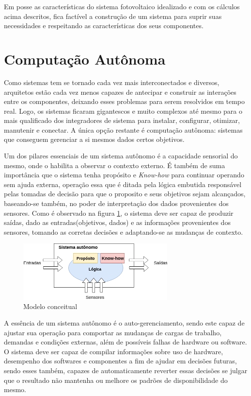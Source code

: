 Em posse as características do sistema fotovoltaico idealizado e com os cálculos acima descritos, fica factível a construção de um sistema para suprir suas necessidades e respeitando as características dos seus componentes.

\section{Computação Autônoma}

Como sistemas tem se tornado cada vez mais interconectados e diversos, arquitetos estão cada vez menos capazes de antecipar e construir as interações entre os componentes, deixando esses problemas para serem resolvidos em tempo real. Logo, os sistemas ficaram gigantescos e muito complexos até mesmo para o mais qualificado dos integradores de sistema para instalar, configurar, otimizar, manutenir e conectar. A única opção restante é computação autônoma: sistemas que conseguem gerenciar a si mesmos dados certos objetivos.\cite{Kephart2003}

Um dos pilares essenciais de um sistema autônomo é a capacidade sensorial do mesmo, onde o habilita a observar o contexto externo. É também de suma importância que o sistema tenha propósito e \textit{Know-how} para continuar operando sem ajuda externa, operação essa que é ditada pela lógica embutida responsável pelas tomadas de decisão para que o proposito e seus objetivos sejam alcançados, baseando-se também, no poder de interpretação dos dados provenientes dos sensores. Como é observado na figura \ref{fig:modelo-conceitual}, o sistema deve ser capaz de produzir saídas, dado as entradas(objetivos, dados) e as informações provenientes dos sensores, tomando as corretas decisões e adaptando-se as mudanças de contexto.

\begin{figure}[H]
    \centering
    \includegraphics[width=0.7\textwidth]{figuras/autonomo.png}
    \caption{Modelo conceitual}
    \label{fig:modelo-conceitual}
\end{figure}


A essência de um sistema autônomo é o auto-gerenciamento, sendo este capaz de ajustar sua operação para comportar as mudanças de cargas de trabalho, demandas e condições externas, além de possíveis falhas de hardware ou software. O sistema deve ser capaz de compilar informações sobre uso de hardware, desempenho dos softwares e componentes a fim de ajudar em decisões futuras, sendo esses também, capazes de automaticamente reverter essas decisões se julgar que o resultado não mantenha ou melhore os padrões de disponibilidade do mesmo.

